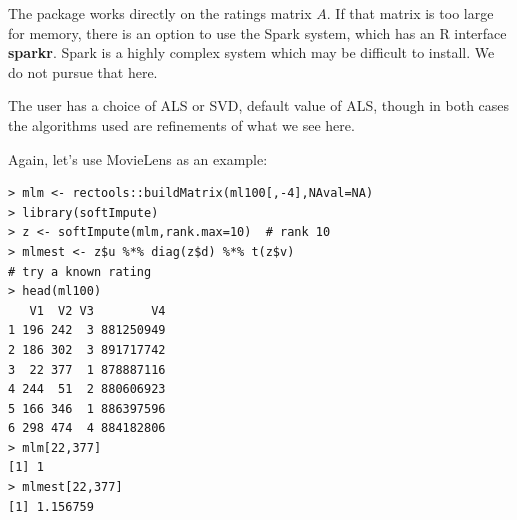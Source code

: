 The package works directly on the ratings matrix $A$.  If that matrix is
too large for memory, there is an option to use the Spark system, which
has an R interface \textbf{sparkr}.  Spark is a highly complex system
which may be difficult to install.  We do not pursue that here.

The user has a choice of ALS or SVD, default value of ALS, though in
both cases the algorithms used are refinements of what we see here.

Again, let's use MovieLens as an example:

\begin{lstlisting}
> mlm <- rectools::buildMatrix(ml100[,-4],NAval=NA)
> library(softImpute)
> z <- softImpute(mlm,rank.max=10)  # rank 10
> mlmest <- z$u %*% diag(z$d) %*% t(z$v)
# try a known rating
> head(ml100)
   V1  V2 V3        V4
1 196 242  3 881250949
2 186 302  3 891717742
3  22 377  1 878887116
4 244  51  2 880606923
5 166 346  1 886397596
6 298 474  4 884182806
> mlm[22,377]
[1] 1
> mlmest[22,377]
[1] 1.156759
\end{lstlisting}

